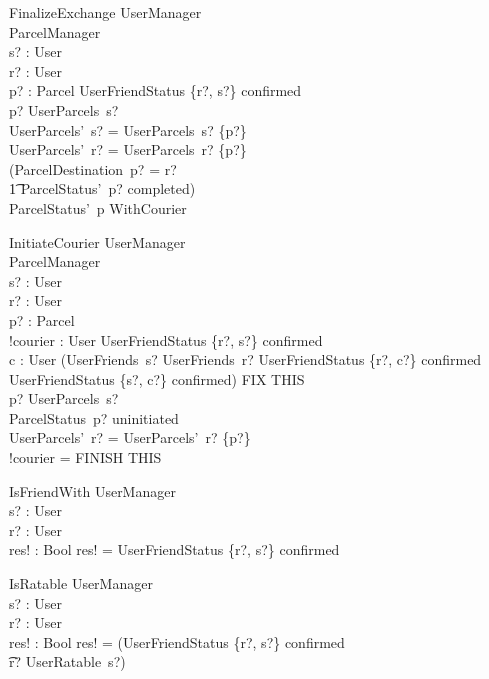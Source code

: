 \documentclass{article}
\begin{document}
\begin{schema}{FinalizeExchange}
	\Delta UserManager\\
	\Delta ParcelManager\\
	s? : User\\
	r? : User\\
	p? : Parcel
	\where
	UserFriendStatus \{r?, s?\} \mapsto confirmed\\
	p? \in UserParcels~s?\\
	UserParcels'~s? = UserParcels~s? \setminus \{p?\}\\
	UserParcels'~r? = UserParcels~r? \cup \{p?\}\\
	(ParcelDestination~p? = r? \\
	\t1 \land ParcelStatus'~p? \mapsto completed)\\
	\lor ParcelStatus'~p \mapsto WithCourier\\
\end{schema}

\begin{schema}{InitiateCourier}
	\Delta UserManager\\
	\Delta ParcelManager\\
	s? : User\\
	r? : User\\
	p? : Parcel\\
	!courier : User
	\where
	UserFriendStatus \{r?, s?\} \mapsto confirmed\\
	\exists c : User \in (UserFriends~s? \cap UserFriends~r? \land UserFriendStatus \{r?, c?\} \mapsto confirmed \land UserFriendStatus \{s?, c?\} \mapsto confirmed) FIX THIS\\
	p? \in UserParcels~s?\\
	ParcelStatus~p? \mapsto uninitiated\\
	UserParcels'~r? = UserParcels'~r? \cup \{p?\}\\
	
	!courier = FINISH THIS
\end{schema}

\begin{schema}{IsFriendWith}
	\Delta UserManager\\
	s? : User\\
	r? : User\\
	res! : Bool
	\where
	res! = UserFriendStatus \{r?, s?\} \mapsto confirmed\\
\end{schema}

\begin{schema}{IsRatable}
	\Delta UserManager\\
	s? : User\\
	r? : User\\
	res! : Bool
	\where
	res! = (UserFriendStatus \{r?, s?\} \mapsto confirmed\\
	\t \land r? \sqsubset UserRatable~s?)
\end{schema}
\end{document}
